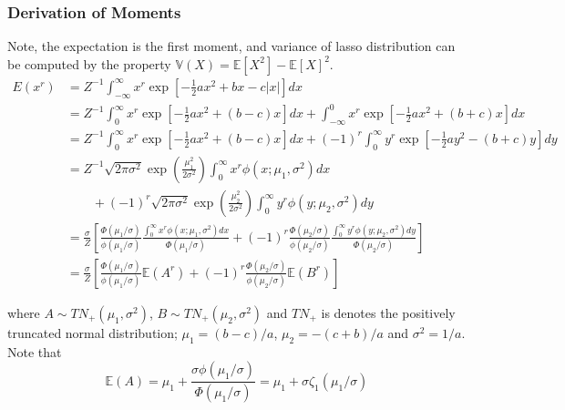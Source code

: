 \subsubsection{Derivation of Moments}
Note, the expectation is the first moment, and variance of lasso distribution can be computed by the property $\mathbb{V}(X) = \mathbb{E}[X^2]- \mathbb{E}[X]^2$.
\begin{equation}
	\begin{array}{rl}
		E(x^r)
		&  = Z^{-1} \int_{-\infty}^\infty x^r \exp\left[ -\tfrac{1}{2}ax^2 + bx - c|x| \right] dx
		\\ [2ex]
		& 
		= Z^{-1}  \int_0^\infty   x^r \exp\left[ -\tfrac{1}{2}ax^2 + (b - c)x \right] dx
		+ \int_{-\infty}^0 x^r \exp\left[ -\tfrac{1}{2}ax^2 + (b + c)x \right] dx
		\\ [2ex]
		& 
		=  Z^{-1}  \int_0^\infty x^r \exp\left[ -\tfrac{1}{2}ax^2 + (b - c)x \right] dx
		+ (-1)^r\int_0^\infty y^r \exp\left[ -\tfrac{1}{2}ay^2 - (b + c)y \right] dy
		\\ [2ex]
		& 
		= Z^{-1}  \sqrt{2\pi\sigma^2}
		\exp\left(  \frac{\mu_1^2}{2\sigma^2} \right) \int_0^\infty x^r \phi(x;\mu_1,\sigma^2) dx
		\\ [2ex]
		&  \qquad + (-1)^r    \sqrt{2\pi\sigma^2}   \exp\left(  \frac{\mu_2^2}{2\sigma^2} \right) \int_0^\infty y^r \phi(y;\mu_2,\sigma^2) dy
		
		\\ [2ex]
		& 
		= \frac{\sigma}{Z} \left[  
		\frac{\Phi(\mu_1/\sigma)}{\phi(\mu_1/\sigma)} \frac{\int_0^\infty x^r \phi(x;\mu_1,\sigma^2) dx}{\Phi(\mu_1/\sigma)}
		+ (-1)^r  \frac{\Phi(\mu_2/\sigma)}{\phi(\mu_2/\sigma)}  \frac{\int_0^\infty y^r \phi(y;\mu_2,\sigma^2) dy}{\Phi(\mu_2/\sigma)}
		\right] 
		
		\\ [4ex]
		& 
		= \frac{\sigma}{Z} \left[  
		\frac{\Phi(\mu_1/\sigma)}{\phi(\mu_1/\sigma)} 
		\mathbb{E}( A^r )
		+ (-1)^r  \frac{\Phi(\mu_2/\sigma)}{\phi(\mu_2/\sigma)}  \mathbb{E}( B^r )
		\right] 
	\end{array} 
	\label{eq:LassoMoment}
\end{equation}





\noindent where $A\sim TN_+(\mu_1,\sigma^2)$, $B\sim TN_+(\mu_2,\sigma^2)$ and $TN_+$ is denotes the positively truncated normal distribution; $\mu_1 = (b-c)/a$, $\mu_2 = -(c + b)/a$ and $\sigma^2 = 1/a$.
Note that
$$
\mathbb{E}(A) = \mu_1 + \frac{\sigma \phi(\mu_1/\sigma)}{\Phi(\mu_1/\sigma)} = \mu_1 + \sigma \zeta_1(\mu_1/\sigma)
$$

